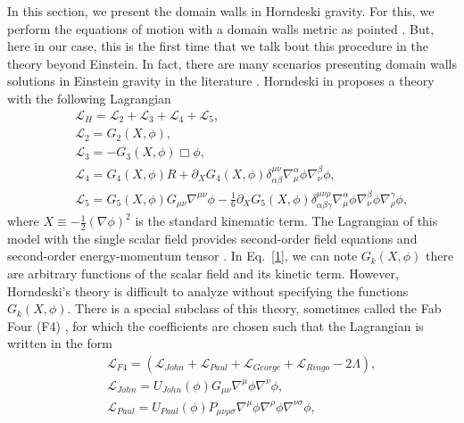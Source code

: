 \documentclass[aps,12pt, a4paper,nofootinbib]{revtex4}
\begin{document}
{In this section, we present the domain walls in Horndeski gravity. For this, we perform the equations of motion with a domain walls metric as pointed \cite{Bazeia:2007vx}. But, here in our case, this is the first time that we talk bout this procedure in the theory beyond Einstein. In fact, there are many scenarios presenting domain walls solutions in Einstein gravity in the literature \cite{Cvetic:1996vr,Vilenkin:1981zs,Vilenkin:1984hy,Lee,Zeldovich,Kuzmin,Kuzmin1,Kuzmin2,Kuzmin3,Groen:1992sm,La:1992fs,Bazeia:2007vx}. Horndeski in \cite{Horndeski:1974wa} proposes a theory with the following Lagrangian
\begin{eqnarray}
&&\mathcal{L}_{H}=\mathcal{L}_{2}+\mathcal{L}_{3}+\mathcal{L}_{4}+\mathcal{L}_{5},\label{01}\\
&&\mathcal{L}_{2}=G_{2}(X,\phi),\nonumber\\
&&\mathcal{L}_{3}=-G_{3}(X,\phi)\Box\phi,\nonumber\\
&&\mathcal{L}_{4}=G_{4}(X,\phi)R+\partial_{X}G_{4}(X,\phi)\delta^{\mu\nu}_{\alpha\beta}\nabla^{\alpha}_{\mu}\phi\nabla^{\beta}_{\nu}\phi,\nonumber\\
&&\mathcal{L}_{5}=G_{5}(X,\phi)G_{\mu\nu}\nabla^{\mu\nu}\phi-\frac{1}{6}\partial_{X}G_{5}(X,\phi)\delta^{\mu\nu\rho}_{\alpha\beta\gamma}\nabla^{\alpha}_{\mu}\phi\nabla^{\beta}_{\nu}\phi\nabla^{\gamma}_{\rho}\phi,\nonumber
\end{eqnarray}
where ${X\equiv -\frac{1}{2}(\nabla\phi)^{2}}$ is the standard kinematic term. The Lagrangian of this model with the single scalar field provides second-order field equations and second-order energy-momentum tensor \cite{Horndeski:1974wa,Anabalon:2013oea,Cisterna:2014nua,Heisenberg:2018vsk}. In Eq.~\eqref{1}, we can note $G_{k}(X,\phi)$ there are arbitrary functions of the scalar field and its kinetic term. {However, Horndeski's theory is difficult to analyze without specifying the functions $G_{k}(X,\phi)$. There is a special subclass of this theory, sometimes called the Fab Four (F4) \cite{Charmousis:2011bf,Charmousis:2011ea}, for which the coefficients are chosen such that the Lagrangian is written in the form
\begin{eqnarray}
&&\mathcal{L}_{F4}=(\mathcal{L}_{John}+\mathcal{L}_{Paul}+\mathcal{L}_{George}+\mathcal{L}_{Ringo }-2\Lambda),\\
&&\mathcal{L}_{John}=U_{John}(\phi)G_{\mu\nu}\nabla^{\mu}\phi\nabla^{\nu}\phi,\\
&&\mathcal{L}_{Paul}=U_{Paul}(\phi)P_{\mu\nu\rho\sigma}\nabla^{\mu}\phi\nabla^{\rho}\phi\nabla ^{\nu\sigma}\phi,\\

\end{eqnarray}}}
\end{document}
